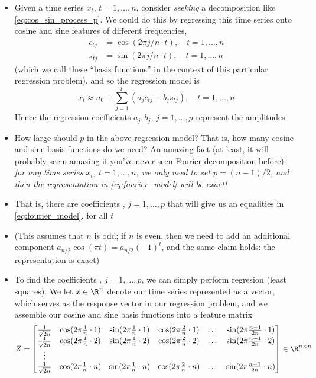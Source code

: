 \documentclass{article}
\begin{document}
\begin{itemize}
\item Given a time series $x_t$, $t = 1,\dots,n$, consider \emph{seeking} a
  decomposition like \eqref{eq:cos_sin_process_p}. We could do this by
  regressing this time series onto cosine and sine features of different
  frequencies,  
  \begin{align*}
  c_{tj} &= \cos(2\pi j/n \cdot t), \quad t = 1,\dots,n \\
  s_{tj} &= \sin(2\pi j/n \cdot t), \quad t = 1,\dots,n
  \end{align*}
  (which we call these ``basis functions'' in the context of this particular
  regression problem), and so the regression model is 
  \begin{equation}
  \label{eq:fourier_model}
  x_t \approx a_0 + \sum_{j=1}^p (a_j c_{tj} + b_j s_{tj}), \quad t = 1,\dots,n 
  \end{equation}
  Hence the regression coefficients $a_j,b_j$, $j = 1,\dots,p$ represent the 
  amplitudes 

\item How large should $p$ in the above regression model? That is, how many
  cosine and sine basis functions do we need? An amazing fact (at least, it will
  probably seem amazing if you've never seen Fourier decomposition before): 
  \emph{for any time series $x_t$, $t = 1,\dots,n$, we only need to set $p =
    (n-1)/2$, and then the representation in \eqref{eq:fourier_model} will be 
    exact!}  

\item That is, there are coefficients , $j =
  1,\dots,p$ that will give us an equalities in \eqref{eq:fourier_model}, for
  all $t$  

\item (This assumes that $n$ is odd; if $n$ is even, then we need to add an
  additional component $a_{n/2} \cos(\pi t) = a_{n/2} (-1)^t$, and the same
  claim holds: the representation is exact)  

\item To find the coefficients , $j = 1,\dots,p$,
  we can simply perform regresion (least squares). We let $x \in \R^n$ denote
  our time series represented as a vector, which serves as the response vector
  in our regression problem, and we assemble our cosine and sine basis functions
  into a feature matrix  
  \[
  Z = \begin{bmatrix}
  \frac{1}{\sqrt{2n}} & \cos(2\pi \frac{1}{n} \cdot 1) & \sin(2\pi \frac{1}{n}
  \cdot 1) & \cos(2\pi \frac{2}{n} \cdot 1) & \dots & \sin(2\pi \frac{n-1}{2n}
  \cdot 1) \\  
  \frac{1}{\sqrt{2n}}  & \cos(2\pi \frac{1}{n} \cdot 2) & \sin(2\pi \frac{1}{n}
  \cdot 2) & \cos(2\pi \frac{2}{n} \cdot 2) & \dots & \sin(2\pi \frac{n-1}{2n}
  \cdot 2) \\  
  \vdots & & & & & \\
  \frac{1}{\sqrt{2n}}  & \cos(2\pi \frac{1}{n} \cdot n) & \sin(2\pi \frac{1}{n}
  \cdot n) & \cos(2\pi \frac{2}{n} \cdot n) & \dots & \sin(2\pi \frac{n-1}{2n}
  \cdot n)  
  \end{bmatrix} \in \R^{n \times n}
  \]


\end{itemize}
\end{document}
